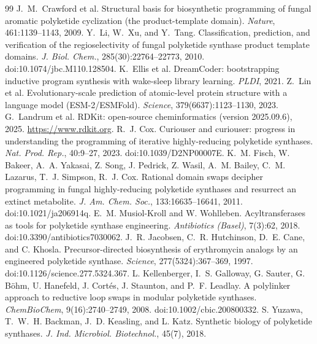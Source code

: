 \documentclass[11pt]{article}
\theoremstyle{definition}
\begin{document}
\begin{thebibliography}{99}
 J.~M.~Crawford et al. Structural basis for
biosynthetic programming of fungal aromatic polyketide cyclization (the product-template domain).
\emph{Nature}, 461:1139--1143, 2009.
 Y.~Li, W.~Xu, and Y.~Tang. Classification, prediction, and
verification of the regioselectivity of fungal polyketide synthase product template domains.
\emph{J. Biol. Chem.}, 285(30):22764--22773, 2010. doi:10.1074/jbc.M110.128504.
 K.~Ellis et al. DreamCoder: bootstrapping inductive
program synthesis with wake-sleep library learning. \emph{PLDI}, 2021.
 Z.~Lin et al. Evolutionary-scale prediction of atomic-level
protein structure with a language model (ESM-2/ESMFold). \emph{Science}, 379(6637):1123--1130,
2023.
 G.~Landrum et al. RDKit: open-source cheminformatics (version
2025.09.6), 2025. \url{https://www.rdkit.org}.
 R.~J. Cox. Curiouser and curiouser: progress in understanding the
programming of iterative highly-reducing polyketide synthases. \emph{Nat. Prod. Rep.}, 40:9--27, 2023.
doi:10.1039/D2NP00007E.
 K.~M. Fisch, W. Bakeer, A.~A. Yakasai, Z. Song, J. Pedrick,
Z. Wasil, A.~M. Bailey, C.~M. Lazarus, T.~J. Simpson, R.~J. Cox. Rational domain swaps decipher
programming in fungal highly-reducing polyketide synthases and resurrect an extinct metabolite.
\emph{J. Am. Chem. Soc.}, 133:16635--16641, 2011. doi:10.1021/ja206914q.
 E.~M. Musiol-Kroll and W. Wohlleben.
Acyltransferases as tools for polyketide synthase engineering. \emph{Antibiotics (Basel)},
7(3):62, 2018. doi:10.3390/antibiotics7030062.
 J.~R. Jacobsen, C.~R. Hutchinson, D.~E. Cane, and
C. Khosla. Precursor-directed biosynthesis of erythromycin analogs by an engineered polyketide
synthase. \emph{Science}, 277(5324):367--369, 1997. doi:10.1126/science.277.5324.367.
 L. Kellenberger, I.~S. Galloway, G. Sauter,
G. B\"{o}hm, U. Hanefeld, J. Cort\'{e}s, J. Staunton, and P.~F. Leadlay. A polylinker approach to
reductive loop swaps in modular polyketide synthases. \emph{ChemBioChem}, 9(16):2740--2749, 2008.
doi:10.1002/cbic.200800332.
 S. Yuzawa, T.~W.~H. Backman, J.~D. Keasling, and L. Katz.
Synthetic biology of polyketide synthases. \emph{J. Ind. Microbiol. Biotechnol.}, 45(7), 2018.

\end{thebibliography}
\end{document}
